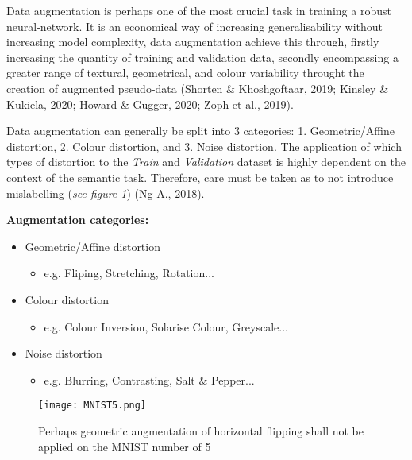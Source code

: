 \documentclass[11pt, a4paper, twoside]{report}
\begin{document}
Data augmentation is perhaps one of the most crucial task in training a robust neural-network. It is an economical way of increasing generalisability without increasing model complexity, data augmentation achieve this through, firstly increasing the quantity of training and validation data, secondly encompassing a greater range of textural, geometrical, and colour variability throught the creation of augmented pseudo-data (Shorten \& Khoshgoftaar, 2019; Kinsley \& Kukiela, 2020; Howard \& Gugger, 2020; Zoph et al., 2019).\\\par

Data augmentation can generally be split into 3 categories: 1. Geometric/Affine distortion, 2. Colour distortion, and 3. Noise distortion. The application of which types of distortion to the \textit{Train} and \textit{Validation} dataset is highly dependent on the context of the semantic task. Therefore, care must be taken as to not introduce mislabelling (\textit{see figure \ref{fig:MNIST5}}) (Ng A., 2018).\\\par

\textbf{Augmentation categories:}

\begin{itemize}
  \item Geometric/Affine distortion
    \begin{itemize}
      \item e.g. Fliping, Stretching, Rotation...
    \end{itemize}
\end{itemize}
\begin{itemize}
  \item Colour distortion
    \begin{itemize}
      \item e.g. Colour Inversion, Solarise Colour, Greyscale...
    \end{itemize}
\end{itemize}
\begin{itemize}
  \item Noise distortion
    \begin{itemize}
      \item e.g. Blurring, Contrasting, Salt \& Pepper...
    \end{itemize}
\end{itemize}


\begin{figure}[H]
  \centering
  \texttt{[image: MNIST5.png]}
  \caption{Perhaps geometric augmentation of horizontal flipping shall not be applied on the MNIST number of 5}
  \label{fig:MNIST5}
\end{figure}
\end{document}
